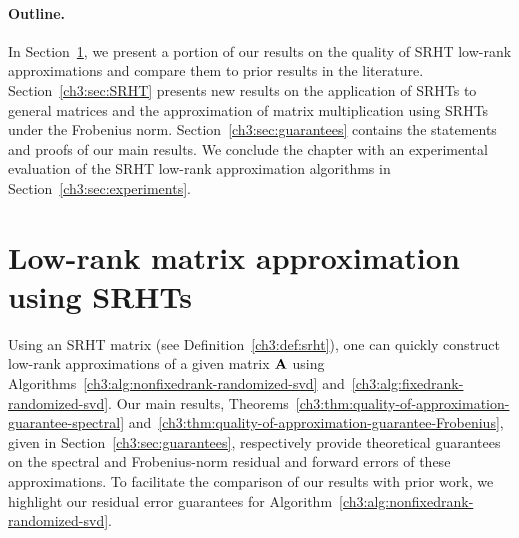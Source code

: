 \paragraph{Outline.} 
In Section~\ref{ch3:sec:lowrank}, we present a portion of our results on the quality of
SRHT low-rank approximations and compare them to prior results in the
literature. 
Section~\ref{ch3:sec:SRHT} presents new results on the application of SRHTs
to general matrices and the approximation of matrix multiplication using SRHTs
under the Frobenius norm. Section~\ref{ch3:sec:guarantees} contains the statements
and proofs of our main results. We conclude the chapter with an experimental evaluation of 
the SRHT low-rank approximation algorithms in Section~\ref{ch3:sec:experiments}.

\section{Low-rank matrix approximation using SRHTs}\label{ch3:sec:lowrank}
Using an SRHT matrix (see Definition~\ref{ch3:def:srht}),
one can quickly construct low-rank approximations of a given matrix $\mathbf{A}$ using 
Algorithms~\ref{ch3:alg:nonfixedrank-randomized-svd} and~\ref{ch3:alg:fixedrank-randomized-svd}.
Our main results, Theorems~\ref{ch3:thm:quality-of-approximation-guarantee-spectral} 
and~\ref{ch3:thm:quality-of-approximation-guarantee-Frobenius}, given in Section~\ref{ch3:sec:guarantees}, respectively
provide theoretical guarantees on the spectral and Frobenius-norm residual and forward errors of these approximations. To facilitate 
the comparison of our results with prior work, we highlight our residual error guarantees for Algorithm~\ref{ch3:alg:nonfixedrank-randomized-svd}.

